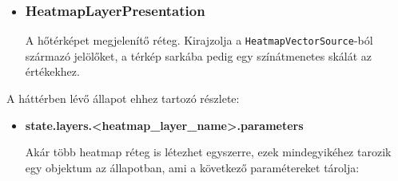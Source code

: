 \begin{itemize}
\item\subsubsection{HeatmapLayerPresentation}
A hőtérképet megjelenítő réteg. Kirajzolja a \verb|HeatmapVectorSource|-ból
származó jelölőket, a térkép sarkába pedig egy színátmenetes skálát az
értékekhez.

\end{itemize}
\noindent A háttérben lévő állapot ehhez tartozó részlete:
\begin{itemize}

  \item \textbf{state.layers.<heatmap\_layer\_name>.parameters}

  Akár több heatmap réteg is létezhet egyszerre, ezek mindegyikéhez tarozik egy
  objektum az állapotban, ami a következő paramétereket tárolja:


\end{itemize}
